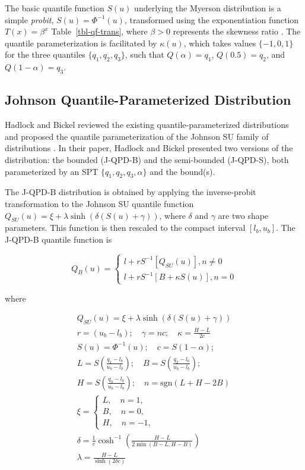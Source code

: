 \documentclass[
  fleqn,
  deca,
  blindrev
]{informs4}
\begin{document}
The basic quantile function
\citep{gilchrist2000StatisticalModellingQuantile, lampasi2008AlternativeApproachMeasurement}
\(S(u)\) underlying the Myerson distribution is a simple \emph{probit},
\(S(u) = \Phi^{-1}(u)\), transformed using the exponentiation function
\(T(x) = \beta^{x}\) Table~\ref{tbl-qf-trans}, where \(\beta > 0\)
represents the skewness ratio
\citep{gilchrist2000StatisticalModellingQuantile}. The quantile
parameterization is facilitated by \(\kappa(u)\), which takes values
\(\{-1,0,1\}\) for the three quantiles \(\{q_1, q_2, q_3\}\), such that
\(Q(\alpha) = q_1\), \(Q(0.5) = q_2\), and \(Q(1 - \alpha) = q_3\).

\subsection{Johnson Quantile-Parameterized
Distribution}\label{johnson-quantile-parameterized-distribution}

Hadlock and Bickel
\citep{hadlock2017QuantileparameterizedMethodsQuantifying} reviewed the
existing quantile-parameterized distributions and proposed the quantile
parameterization of the Johnson SU family of distributions
\citep{johnson1994ContinuousUnivariateDistributions}. In their paper,
Hadlock and Bickel
\citep{hadlock2017JohnsonQuantileParameterizedDistributions} presented
two versions of the distribution: the bounded (J-QPD-B) and the
semi-bounded (J-QPD-S), both parameterized by an SPT
\(\{q_1, q_2, q_3, \alpha\}\) and the bound(s).

The J-QPD-B distribution is obtained by applying the inverse-probit
transformation to the Johnson SU quantile function
\(Q_{SU}(u) = \xi + \lambda\sinh(\delta(S(u) + \gamma))\), where
\(\delta\) and \(\gamma\) are two shape parameters. This function is
then rescaled to the compact interval \([l_b, u_b]\). The J-QPD-B
quantile function is

\[
Q_B(u)=
\begin{cases}
l+rS^{-1}\left[Q_{SU}(u)\right], n\neq0\\
l+rS^{-1}\left[B+\kappa S(u)\right],n=0
\end{cases}
\]

where

\[
\begin{gathered}
Q_{SU}(u) = \xi + \lambda\sinh(\delta(S(u) + \gamma))\\
r=(u_b-l_b); \quad \gamma=nc; \quad \kappa=\frac{H-L}{2c}\\
S(u)=\Phi^{-1}(u); \quad c=S(1-\alpha);\\
L=S\left(\frac{q_1-l_b}{u_b-l_b}\right); \quad  B=S\left(\frac{q_2-l_b}{u_b-l_b}\right);\\
H=S\left(\frac{q_3-l_b}{u_b-l_b}\right); \quad n=\text{sgn}(L+H-2B)\\
\xi=\begin{cases}L, \quad n=1,\\
B, \quad n=0,\\
H, \quad n=-1,\end{cases}\\
\delta=\frac{1}{c}\cosh^{-1}\left(\frac{H-L}{2\min(B-L,H-B)}\right)\\
\lambda=\frac{H-L}{\sinh(2\delta c)}
\end{gathered}
\]
\end{document}
